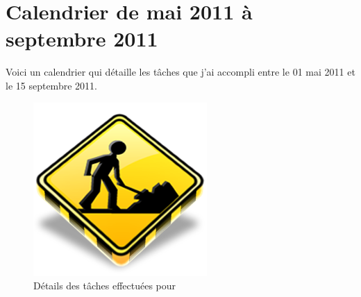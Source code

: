 \chapter{Calendrier de mai 2011 à septembre 2011}
Voici un calendrier qui détaille les tâches que j'ai accompli entre le 01 mai 2011 et le 15 septembre 2011.

\begin{figure}[h!]
	\begin{center}
		\includegraphics[scale=1]{Contenu/Annexes/Images/Calendrier_MaiSeptembre.png}
	\end{center}

	\caption{Détails des tâches effectuées pour \fidit}
	\label{calendrier_maiseptembre}
\end{figure}
